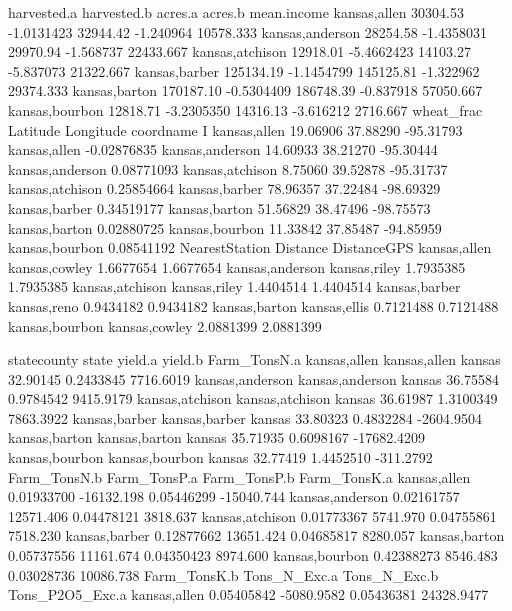 \documentclass{report}
\begin{document}
\begin{Schunk}
\begin{Soutput}
                harvested.a harvested.b   acres.a   acres.b mean.income
kansas,allen       30304.53  -1.0131423  32944.42 -1.240964   10578.333
kansas,anderson    28254.58  -1.4358031  29970.94 -1.568737   22433.667
kansas,atchison    12918.01  -5.4662423  14103.27 -5.837073   21322.667
kansas,barber     125134.19  -1.1454799 145125.81 -1.322962   29374.333
kansas,barton     170187.10  -0.5304409 186748.39 -0.837918   57050.667
kansas,bourbon     12818.71  -3.2305350  14316.13 -3.616212    2716.667
                wheat_frac Latitude Longitude       coordname           I
kansas,allen      19.06906 37.88290 -95.31793    kansas,allen -0.02876835
kansas,anderson   14.60933 38.21270 -95.30444 kansas,anderson  0.08771093
kansas,atchison    8.75060 39.52878 -95.31737 kansas,atchison  0.25854664
kansas,barber     78.96357 37.22484 -98.69329   kansas,barber  0.34519177
kansas,barton     51.56829 38.47496 -98.75573   kansas,barton  0.02880725
kansas,bourbon    11.33842 37.85487 -94.85959  kansas,bourbon  0.08541192
                NearestStation  Distance DistanceGPS
kansas,allen     kansas,cowley 1.6677654   1.6677654
kansas,anderson   kansas,riley 1.7935385   1.7935385
kansas,atchison   kansas,riley 1.4404514   1.4404514
kansas,barber      kansas,reno 0.9434182   0.9434182
kansas,barton     kansas,ellis 0.7121488   0.7121488
kansas,bourbon   kansas,cowley 2.0881399   2.0881399
\end{Soutput}
\begin{Soutput}
                    statecounty  state  yield.a   yield.b Farm_TonsN.a
kansas,allen       kansas,allen kansas 32.90145 0.2433845    7716.6019
kansas,anderson kansas,anderson kansas 36.75584 0.9784542    9415.9179
kansas,atchison kansas,atchison kansas 36.61987 1.3100349    7863.3922
kansas,barber     kansas,barber kansas 33.80323 0.4832284   -2604.9504
kansas,barton     kansas,barton kansas 35.71935 0.6098167  -17682.4209
kansas,bourbon   kansas,bourbon kansas 32.77419 1.4452510    -311.2792
                Farm_TonsN.b Farm_TonsP.a Farm_TonsP.b Farm_TonsK.a
kansas,allen      0.01933700   -16132.198   0.05446299   -15040.744
kansas,anderson   0.02161757    12571.406   0.04478121     3818.637
kansas,atchison   0.01773367     5741.970   0.04755861     7518.230
kansas,barber     0.12877662    13651.424   0.04685817     8280.057
kansas,barton     0.05737556    11161.674   0.04350423     8974.600
kansas,bourbon    0.42388273     8546.483   0.03028736    10086.738
                Farm_TonsK.b Tons_N_Exc.a Tons_N_Exc.b Tons_P2O5_Exc.a
kansas,allen      0.05405842   -5080.9582   0.05436381      24328.9477

\end{Soutput}
\end{Schunk}
\end{document}
